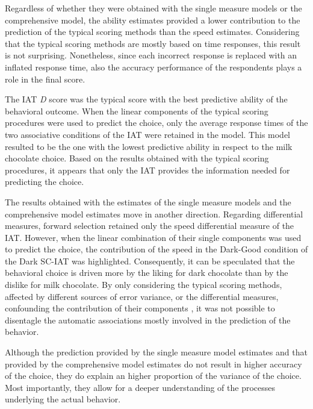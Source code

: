 \documentclass[12pt]{book}
\begin{document}
Regardless of whether they were obtained with the single measure models or the comprehensive model, the ability estimates provided a lower contribution to the prediction of the typical scoring methods than the speed estimates. 
	Considering that the typical scoring methods are mostly based on time responses, this result is not surprising. 
	Nonetheless, since each incorrect response is replaced with an inflated response time, also the accuracy performance of the respondents plays a role in the final score. 


The IAT \emph{D} score was the typical score with the best predictive ability of the behavioral outcome. 
When the linear components of the typical scoring procedures were used to predict the choice, only the average response times of the two associative conditions of the IAT were retained in the model. 
This model resulted to be the one with the lowest predictive ability in respect to the milk chocolate choice. 
Based on the results obtained with the typical scoring procedures, it appears that only the IAT provides the information needed for predicting the choice. 

The results obtained with the estimates of the single measure models and the comprehensive model estimates move in another direction. 
Regarding differential measures, forward selection retained only the speed differential measure of the IAT. 
However, when the linear combination of their single components was used to predict the choice, the contribution of the speed in the Dark-Good condition of the Dark SC-IAT was highlighted.
Consequently, it can be speculated that the behavioral choice is driven more by the liking for dark chocolate than by the dislike for milk chocolate. 
By only considering the typical scoring methods, affected by different sources of error variance, or the differential measures, confounding the contribution of their components \cite{fiedler2006}, it was not possible to disentagle the automatic associations mostly involved in the prediction of the behavior.

Although the prediction provided by the single measure model estimates and that provided by the comprehensive model estimates do not result in higher accuracy of the choice, they do explain an higher proportion of the variance of the choice. 
Most importantly, they allow for a deeper understanding of the processes underlying the actual behavior. 
\end{document}
